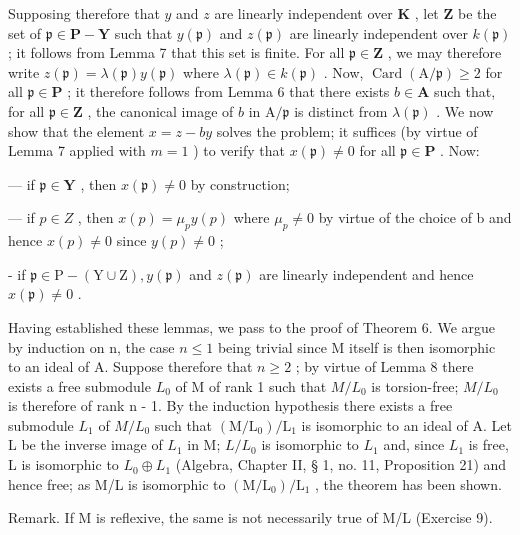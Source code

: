 Supposing therefore that \(y\) and \(z\) are linearly independent over \(\mathbf{K}\) , let \(\mathbf{Z}\) be the set of \(\mathfrak{p} \in \mathbf{P} - \mathbf{Y}\) such that \(y(\mathfrak{p})\) and \(z(\mathfrak{p})\) are linearly independent over \(k(\mathfrak{p})\) ; it follows from Lemma 7 that this set is finite. For all \(\mathfrak{p} \in \mathbf{Z}\) , we may therefore write \(z(\mathfrak{p}) = \lambda(\mathfrak{p})y(\mathfrak{p})\) where \(\lambda(\mathfrak{p}) \in k(\mathfrak{p})\) . Now, \(\operatorname{Card}(\mathrm{A}/\mathfrak{p}) \geqslant 2\) for all \(\mathfrak{p} \in \mathbf{P}\) ; it therefore follows from Lemma 6 that there exists \(b \in \mathbf{A}\) such that, for all \(\mathfrak{p} \in \mathbf{Z}\) , the canonical image of \(b\) in \(\mathrm{A}/\mathfrak{p}\) is distinct from \(\lambda(\mathfrak{p})\) . We now show that the element \(x = z - by\) solves the problem; it suffices (by virtue of Lemma 7 applied with \(m = 1\) ) to verify that \(x(\mathfrak{p}) \neq 0\) for all \(\mathfrak{p} \in \mathbf{P}\) . Now:

--- if \(\mathfrak{p} \in \mathbf{Y}\) , then \(x(\mathfrak{p}) \neq 0\) by construction;

--- if \(p \in Z\) , then \(x(p) = \mu_{p} y(p)\) where \(\mu_{p} \neq 0\) by virtue of the choice of b and hence \(x(p) \neq 0\) since \(y(p) \neq 0\) ;

- if \(\mathfrak{p} \in \mathrm{P} - (\mathrm{Y} \cup \mathrm{Z}), y(\mathfrak{p})\) and \(z(\mathfrak{p})\) are linearly independent and hence \(x(\mathfrak{p}) \neq 0\) .

Having established these lemmas, we pass to the proof of Theorem 6. We argue by induction on n, the case \(n \leqslant 1\) being trivial since M itself is then isomorphic to an ideal of A. Suppose therefore that \(n \geqslant 2\) ; by virtue of Lemma 8 there exists a free submodule \(L_{0}\) of M of rank 1 such that \(M/L_{0}\) is torsion-free; \(M/L_{0}\) is therefore of rank n - 1. By the induction hypothesis there exists a free submodule \(L_{1}\) of \(M/L_{0}\) such that \((\mathrm{M}/\mathrm{L}_{0})/\mathrm{L}_{1}\) is isomorphic to an ideal of A. Let L be the inverse image of \(L_{1}\) in M; \(L/L_{0}\) is isomorphic to \(L_{1}\) and, since \(L_{1}\) is free, L is isomorphic to \(L_{0} \oplus L_{1}\) (Algebra, Chapter II, § 1, no. 11, Proposition 21) and hence free; as M/L is isomorphic to \((\mathrm{M}/\mathrm{L}_{0})/\mathrm{L}_{1}\) , the theorem has been shown.

Remark. If M is reflexive, the same is not necessarily true of M/L (Exercise 9).

